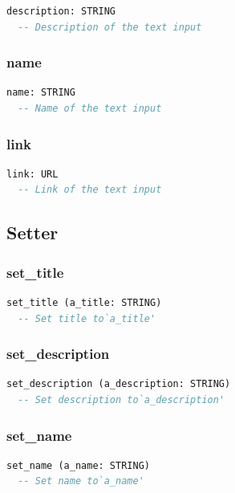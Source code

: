 \begin{lstlisting}[language=Eiffel]
description: STRING
  -- Description of the text input
\end{lstlisting}

\subsubsection{name}

\begin{lstlisting}[language=Eiffel]
name: STRING
  -- Name of the text input
\end{lstlisting}

\subsubsection{link}

\begin{lstlisting}[language=Eiffel]
link: URL
  -- Link of the text input
\end{lstlisting}

\subsection{Setter}
\label{sec:channel-text-input-setter}

\subsubsection{set\_title}

\begin{lstlisting}[language=Eiffel]
set_title (a_title: STRING)
  -- Set title to`a_title'
\end{lstlisting}

\subsubsection{set\_description}

\begin{lstlisting}[language=Eiffel]
set_description (a_description: STRING)
  -- Set description to`a_description'
\end{lstlisting}

\subsubsection{set\_name}

\begin{lstlisting}[language=Eiffel]
set_name (a_name: STRING)
  -- Set name to`a_name'
\end{lstlisting}

